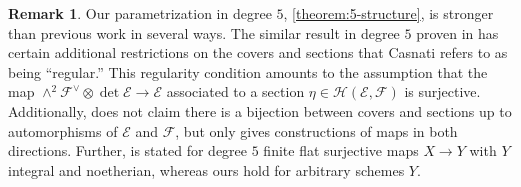 \documentclass[12 pt]{amsart}
\theoremstyle{plain}
\theoremstyle{definition}
\newtheorem{remark}[theorem]{Remark}
\theoremstyle{remark}
\numberwithin{equation}{section}
\newcommand\sce{\mathscr E}
\newcommand\scf{\mathscr F}
\newcommand\sch{\mathscr H}
\newcommand \ra{\rightarrow}
\begin{document}
\begin{remark}
	\label{remark:new-structure-theorems}
	Our parametrization in degree $5$,
	\autoref{theorem:5-structure},
	is stronger than  previous work in several ways.
	The similar result in degree $5$ proven in \cite[Thm.
	3.8]{casnati:covers-algebraic-varieties-ii}
	has certain additional restrictions on the covers and sections
	that Casnati refers to as being ``regular.''
	This regularity condition amounts to the assumption that
	the map $\wedge^2 \scf^\vee \otimes \det \sce \to \sce$ associated to a
	section $\eta \in \sch(\sce, \scf)$ is surjective.
	Additionally, \cite[Thm.
	3.8]{casnati:covers-algebraic-varieties-ii}
	does not claim there is a bijection between covers and sections up to
	automorphisms of $\sce$ and $\scf$,
	but only gives constructions of maps in both directions.
	Further, \cite[Thm.
	3.8]{casnati:covers-algebraic-varieties-ii} is stated for degree $5$ finite flat 
	surjective maps $X \ra Y$ with $Y$
	integral and noetherian,
	whereas ours hold for arbitrary schemes $Y$.
\end{remark}
\end{document}
